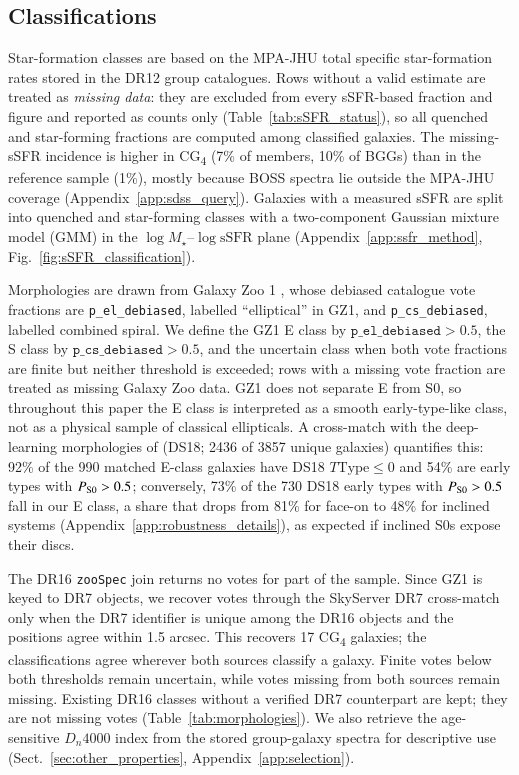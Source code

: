 \documentclass{aa}
\newcommand{\CG}{CG\textsubscript{4}}
\begin{document}
\subsection{Classifications}\label{sec:ssfr_classification}
Star-formation classes are based on the MPA-JHU total specific star-formation rates \citep{Brinchmann+04,Kauffmann+03b} stored in the DR12 group catalogues. Rows without a valid estimate are treated as \emph{missing data}: they are excluded from every sSFR-based fraction and figure and reported as counts only (Table~\ref{tab:sSFR_status}), so all quenched and star-forming fractions are computed among classified galaxies. The missing-sSFR incidence is higher in \CG{} (7\% of members, 10\% of BGGs) than in the reference sample (1\%), mostly because BOSS spectra lie outside the MPA-JHU coverage (Appendix~\ref{app:sdss_query}). Galaxies with a measured sSFR are split into quenched and star-forming classes with a two-component Gaussian mixture model (GMM) in the \(\log M_\star\)--\(\log\mathrm{sSFR}\) plane (Appendix~\ref{app:ssfr_method}, Fig.~\ref{fig:sSFR_classification}).

Morphologies are drawn from Galaxy Zoo 1 \citep{Lintott+08,GalaxyZoo1}, whose debiased catalogue vote fractions \citep{Bamford+09} are \texttt{p\_el\_debiased}, labelled ``elliptical'' in GZ1, and \texttt{p\_cs\_debiased}, labelled combined spiral. We define the GZ1 E class by \(\texttt{p\_el\_debiased}>0.5\), the S class by \(\texttt{p\_cs\_debiased}>0.5\), and the uncertain class when both vote fractions are finite but neither threshold is exceeded; rows with a missing vote fraction are treated as missing Galaxy Zoo data. GZ1 does not separate E from S0, so throughout this paper the E class is interpreted as a smooth early-type-like class, not as a physical sample of classical ellipticals. A cross-match with the deep-learning morphologies of \citet{DominguezSanchez2018} (DS18; 2436 of 3857 unique galaxies) quantifies this: 92\% of the 990 matched E-class galaxies have DS18 \(T\mathrm{Type}\leq0\) and 54\% are early types with \(P_{\rm S0}>0.5\); conversely, 73\% of the 730 DS18 early types with \(P_{\rm S0}>0.5\) fall in our E class, a share that drops from 81\% for face-on to 48\% for inclined systems (Appendix~\ref{app:robustness_details}), as expected if inclined S0s expose their discs.


The DR16 \texttt{zooSpec} join returns no votes for part of the sample. Since GZ1 is keyed to DR7 objects, we recover votes through the SkyServer DR7 cross-match only when the DR7 identifier is unique among the DR16 objects and the positions agree within 1.5 arcsec. This recovers 17 \CG{} galaxies; the classifications agree wherever both sources classify a galaxy. Finite votes below both thresholds remain uncertain, while votes missing from both sources remain missing. Existing DR16 classes without a verified DR7 counterpart are kept; they are not missing votes (Table~\ref{tab:morphologies}). We also retrieve the age-sensitive \(D_n4000\) index \citep{Kauffmann+03b} from the stored group-galaxy spectra for descriptive use (Sect.~\ref{sec:other_properties}, Appendix~\ref{app:selection}).
\end{document}
